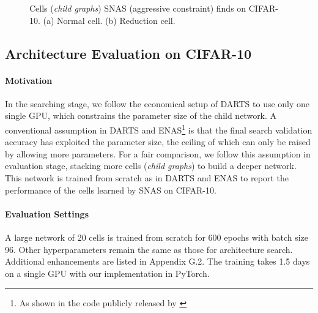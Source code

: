 \documentclass{article} \usepackage{iclr2019_conference,times}
\begin{document}
\begin{figure}[h]
  \centering
  \caption{Cells (\textit{child graphs}) SNAS (aggressive constraint) finds on CIFAR-10. (a) Normal cell. (b) Reduction cell.}
  \label{fig:normal_reduction_smaller}
\end{figure}

\subsection{Architecture Evaluation on CIFAR-10}

\paragraph{Motivation}

In the searching stage, we follow the economical setup of DARTS to use only one single GPU, which constrains the parameter size of the child network. A conventional assumption in DARTS and ENAS\footnote{As shown in the code publicly released by \citet{pham2018efficient}} is that the final search validation accuracy has exploited the parameter size, the ceiling of which can only be raised by allowing more parameters. For a fair comparison, we follow this assumption in evaluation stage, stacking more cells (\textit{child graphs}) to build a deeper network. This network is trained from scratch as in DARTS and ENAS to report the performance of the cells learned by SNAS on CIFAR-10.



\paragraph{Evaluation Settings}

A large network of 20 cells is trained from scratch for 600 epochs with batch size 96. Other hyperparameters remain the same as those for architecture search. Additional enhancements are listed in Appendix G.2. The training takes 1.5 days on a single GPU with our implementation in PyTorch.
\end{document}
